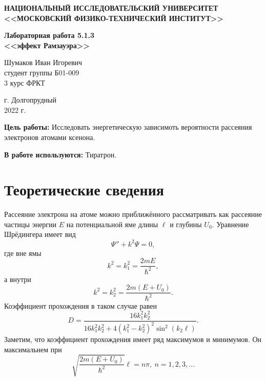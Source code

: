\documentclass[a4paper,12pt]{article} %
\begin{document}
	
	
	\begin{center}
		
		\textbf{НАЦИОНАЛЬНЫЙ ИССЛЕДОВАТЕЛЬСКИЙ УНИВЕРСИТЕТ \\ <<МОСКОВСКИЙ ФИЗИКО-ТЕХНИЧЕСКИЙ ИНСТИТУТ>>}
		\vspace{13ex}
		
		\textbf{Лабораторная работа 5.1.3\\ <<эффект Рамзауэра>>}
		\vspace{40ex}
		
		\normalsize{Шумаков Иван Игоревич \\ студент группы Б01-009\\ 3 курс ФРКТ\\}
	\end{center}
	
	\vfill 
	
	\begin{center}
		г. Долгопрудный\\ 
		2022 г.
	\end{center}
	
	
	\thispagestyle{empty} %
	\newpage

	\textbf{Цель работы:} Исследовать энергетическую зависимоть вероятности рассеяния электронов атомами ксенона.\par
  \textbf{В работе используются:} Тиратрон.\par
    
	\section{Теоретические сведения}
    Рассеяние электрона на атоме можно приближённого рассматривать как рассеяние частицы энергии $E$ на потенциальной яме длины $\ell$ и глубины $U_0$. 
    Уравнение Шрёдингера имеет вид
    \[\Psi'' + k^2 \Psi = 0,\]
    где вне ямы 
    \[k^2 = k_1^2 = \dfrac{2mE}{\hbar^2},\]
    а внутри 
    \[k^2 = k_2^2 = \dfrac{2m(E+U_0)}{\hbar^2}.\]
    Коэффициент прохождения в таком случае равен
    \[D = \dfrac{16 k_1^2 k_2^2}{16k_1^2 k_2^2 + 4(k_1^2 - k_2^2)^2\sin^2(k_2\ell)}.\]
    Заметим, что коэффициент прохождения имеет ряд максимумов и минимумов. 
    Он максимальнем при
    \begin{equation}\label{0}
    \sqrt{\dfrac{2m(E+U_0)}{\hbar^2}}\ell = n\pi,~n=1,2,3,\dots
    \end{equation}
    
\end{document}

